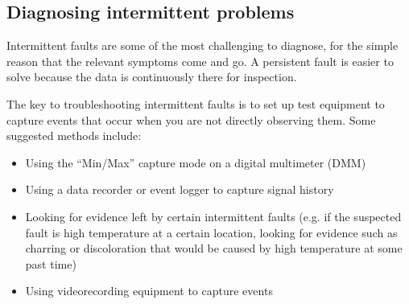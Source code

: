 



























\filbreak
\subsection{Diagnosing intermittent problems}

Intermittent faults are some of the most challenging to diagnose, for the simple reason that the relevant symptoms come and go.  A persistent fault is easier to solve because the data is continuously there for inspection.

The key to troubleshooting intermittent faults is to set up test equipment to capture events that occur when you are not directly observing them.  Some suggested methods include:

\begin{itemize}
\item Using the ``Min/Max'' capture mode on a digital multimeter (DMM)
\item Using a data recorder or event logger to capture signal history 
\item Looking for evidence left by certain intermittent faults (e.g. if the suspected fault is high temperature at a certain location, looking for evidence such as charring or discoloration that would be caused by high temperature at some past time)
\item Using videorecording equipment to capture events
\end{itemize}

